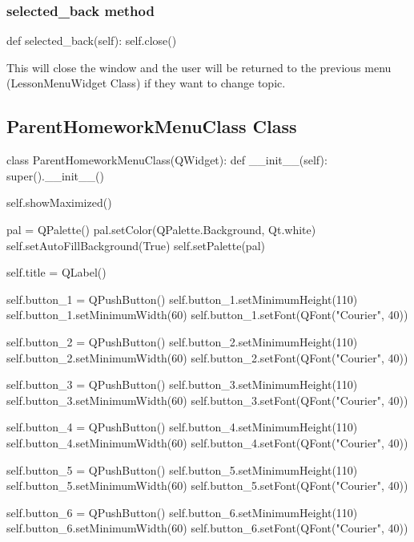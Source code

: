 \subsubsection{selected\_back method}

\begin{python}
def selected_back(self):
	self.close()
\end{python}

This will close the window and the user will be returned to the previous menu (LessonMenuWidget Class) if they want to change topic.

\subsection{ParentHomeworkMenuClass Class}

\begin{python}
class ParentHomeworkMenuClass(QWidget):
    def __init__(self):
        super().__init__()

        self.showMaximized()

        pal = QPalette()
        pal.setColor(QPalette.Background, Qt.white)
        self.setAutoFillBackground(True)
        self.setPalette(pal)

        self.title = QLabel()

        self.button_1 = QPushButton()
        self.button_1.setMinimumHeight(110)
        self.button_1.setMinimumWidth(60)
        self.button_1.setFont(QFont("Courier", 40))
        
        self.button_2 = QPushButton()
        self.button_2.setMinimumHeight(110)
        self.button_2.setMinimumWidth(60)
        self.button_2.setFont(QFont("Courier", 40))
        
        self.button_3 = QPushButton()
        self.button_3.setMinimumHeight(110)
        self.button_3.setMinimumWidth(60)
        self.button_3.setFont(QFont("Courier", 40))
        
        self.button_4 = QPushButton()
        self.button_4.setMinimumHeight(110)
        self.button_4.setMinimumWidth(60)
        self.button_4.setFont(QFont("Courier", 40))
        
        self.button_5 = QPushButton()
        self.button_5.setMinimumHeight(110)
        self.button_5.setMinimumWidth(60)
        self.button_5.setFont(QFont("Courier", 40))
        
        self.button_6 = QPushButton()
        self.button_6.setMinimumHeight(110)
        self.button_6.setMinimumWidth(60)
        self.button_6.setFont(QFont("Courier", 40))


\end{python}
